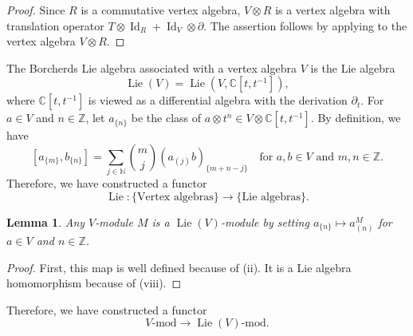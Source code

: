 \documentclass[a4paper, 12pt, reqno]{amsart}
\newtheorem{lemma}[theorem]{Lemma}
\theoremstyle{remark}
\numberwithin{equation}{subsection}
\DeclareMathOperator{\Id}{Id}
\DeclareMathOperator{\Lie}{Lie}
\begin{document}
\begin{proof}
  Since $R$ is a commutative vertex algebra, $V \otimes R$ is a vertex algebra with translation operator $T\otimes\Id_R + \Id_V\otimes\partial$.
  The assertion follows by applying  to the vertex algebra $V \otimes R$.
\end{proof}

The Borcherds Lie algebra associated with a vertex algebra $V$ is the Lie algebra
\begin{equation*}
  \Lie(V) = \Lie(V, \mathbb{C}[t, t^{-1}]),
\end{equation*}
where $\mathbb{C}[t, t^{-1}]$ is viewed as a differential algebra with the derivation $\partial_t$.
For $a \in V$ and $n \in \mathbb{Z}$, let $a_{\{n\}}$ be the class of $a\otimes t^n \in V \otimes \mathbb{C}[t, t^{-1}]$.
By definition, we have
\begin{equation}
  \label{eq:28}
  [a_{\{m\}}, b_{\{n\}}] = \sum_{j \in \mathbb{N}}\binom{m}{j}(a_{(j)}b)_{\{m + n - j\}}\quad \text{for }a, b \in V\text{ and }m, n \in \mathbb{Z}.
\end{equation}
Therefore, we have constructed a functor
\begin{equation*}
  \Lie: \{\text{Vertex algebras}\} \to \{\text{Lie algebras}\}.
\end{equation*}

\begin{lemma}
  \label{lmm:14}
  Any $V$-module $M$ is a $\Lie(V)$-module by setting $a_{\{n\}} \mapsto a^M_{(n)}$ for $a \in V$ and $n \in \mathbb{Z}$.
\end{lemma}

\begin{proof}
  First, this map is well defined because of (ii).
  It is a Lie algebra homomorphism because of (viii).
\end{proof}

Therefore, we have constructed a functor
\begin{equation*}
  V\text{-mod} \to \Lie(V)\text{-mod}.
\end{equation*}
\end{document}
